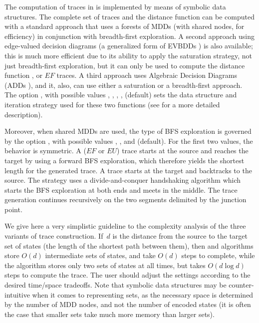 \begin{private}
The computation of traces in {\smart} is implemented by means of symbolic
data structures.
The complete set of traces and the distance function can
be computed with a standard approach that uses a forests of MDDs (with
shared nodes, for efficiency) in conjunction with breadth-first exploration.
A second approach using edge-valued decision diagrams (a generalized form
of EVBDDs \cite{Lai1996EVBDDs}) is also available;
this is much more efficient due to its ability to apply the saturation
strategy, not just breadth-first exploration, but it can only be used to
compute the distance function , or $EF$ traces.
A third approach uses Algebraic Decision Diagrams (ADDs \cite{Bahar1997ADDs}),
and it, also, can use either a saturation or a breadth-first approach.
The option , with possible
values , , ,
,  (default) sets the data structure and
iteration strategy used for these two functions
(see \cite{2002FMCAD-EVMDD} for a more detailed description).

Moreover, when shared MDDs are used, the type of BFS exploration is
governed by the option , with possible values
, , and  (default).
For the first two values, the behavior is symmetric.
A  ($EF$ or $EU$) trace starts at the source and reaches the
target by using a forward BFS exploration, which therefore yields the
shortest length for the generated trace.
A  trace starts at the target and backtracks to the source.
The  strategy uses a divide-and-conquer handshaking algorithm
which starts the BFS exploration at both ends and meets in the middle.
The trace generation continues recursively on the two segments
delimited by the junction point.

We give here a very simplistic guideline to the complexity analysis of the
three variants of trace construction. If~$d$ is the distance from the
source to the target set of states (the length of the shortest path
between them), then  and  algorithms store
$O(d)$ intermediate sets of states, and take $O(d)$ steps to complete,
while the  algorithm stores only two sets of states at all
times, but takes $O(d\log d)$ steps to compute the trace.
The user should adjust the settings according to the desired time/space
tradeoffs.
Note that symbolic data structures may be
counter-intuitive when it comes to representing sets, as the necessary
space is determined by the number of MDD nodes, and not the number of
encoded states (it is often the case that smaller sets take much more
memory than larger sets).
\end{private}

